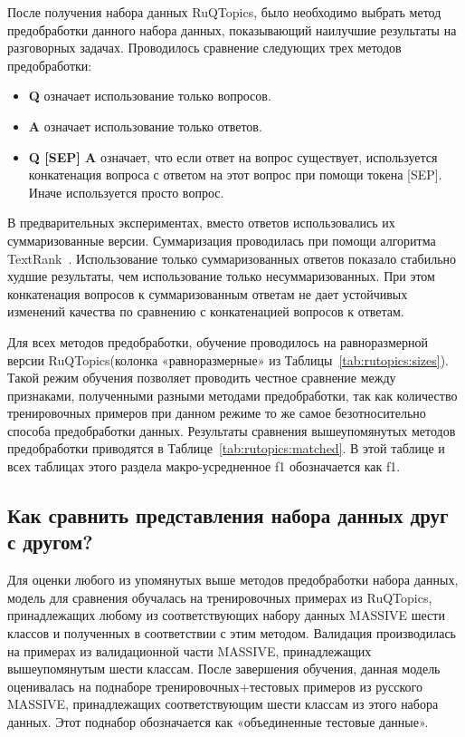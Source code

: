 После получения набора данных {RuQTopics}, было необходимо выбрать метод предобработки данного набора данных, показывающий наилучшие результаты на разговорных задачах. Проводилось сравнение следующих трех методов предобработки:

\begin{itemize}
   \item \textbf{Q} означает использование только вопросов.
   \item \textbf{A} означает использование только ответов.
   \item \textbf{Q [SEP] A} означает, что если ответ на вопрос существует, используется конкатенация вопроса с ответом на этот вопрос при помощи токена [SEP]. Иначе используется просто вопрос.  
\end{itemize}

В предварительных экспериментах, вместо ответов использовались их суммаризованные версии. Суммаризация проводилась при помощи алгоритма TextRank~\cite{summarizer}. Использование только суммаризованных ответов показало стабильно худшие результаты, чем использование только несуммаризованных. При этом конкатенация вопросов к суммаризованным ответам не дает устойчивых изменений качества по сравнению с конкатенацией вопросов к ответам.

Для всех методов предобработки, обучение проводилось на равноразмерной версии {RuQTopics}(колонка «равноразмерные» из Таблицы~\ref{tab:rutopics:sizes}).
Такой режим обучения позволяет проводить честное сравнение между признаками, полученными разными методами предобработки, так как количество тренировочных примеров при данном режиме то же самое безотносительно способа предобработки данных. Результаты сравнения вышеупомянутых методов предобработки приводятся в Таблице~\ref{tab:rutopics:matched}. В этой таблице и всех таблицах этого раздела макро-усредненное f1 обозначается как f1.
 \subsection{Как сравнить представления набора данных друг с другом?}
Для оценки любого из упомянутых выше методов предобработки набора данных, модель для сравнения обучалась на тренировочных примерах из {RuQTopics}, принадлежащих любому из соответствующих набору данных {MASSIVE} шести классов и полученных в соответствии с этим методом. Валидация производилась на примерах из валидационной части MASSIVE, принадлежащих вышеупомянутым шести классам. После завершения обучения, данная модель оценивалась на поднаборе тренировочных+тестовых примеров из русского {MASSIVE}, принадлежащих соответствующим шести классам из этого набора данных. Этот поднабор обозначается как «объединенные тестовые данные».

